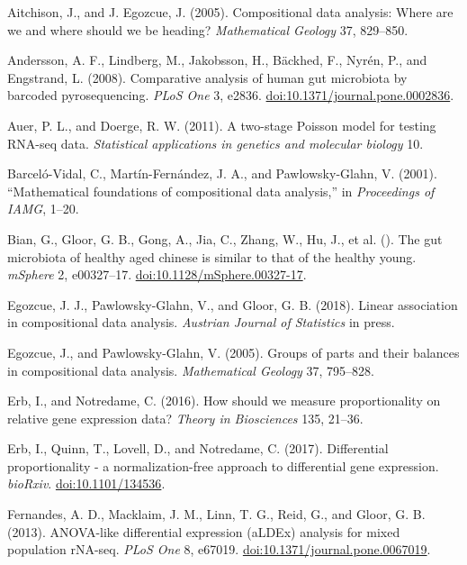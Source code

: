 \documentclass[twocolumn]{article}
\begin{document}
Aitchison, J., and J. Egozcue, J. (2005). Compositional data analysis:
Where are we and where should we be heading? \emph{Mathematical Geology}
37, 829--850.

Andersson, A. F., Lindberg, M., Jakobsson, H., Bäckhed, F., Nyrén, P.,
and Engstrand, L. (2008). Comparative analysis of human gut microbiota
by barcoded pyrosequencing. \emph{PLoS One} 3, e2836.
\href{http://doi.org/10.1371/journal.pone.0002836}{doi:10.1371/journal.pone.0002836}.

Auer, P. L., and Doerge, R. W. (2011). A two-stage Poisson model for
testing RNA-seq data. \emph{Statistical applications in genetics and
molecular biology} 10.

Barceló-Vidal, C., Martín-Fernández, J. A., and Pawlowsky-Glahn, V.
(2001). ``Mathematical foundations of compositional data analysis,'' in
\emph{Proceedings of IAMG}, 1--20.

Bian, G., Gloor, G. B., Gong, A., Jia, C., Zhang, W., Hu, J., et al. ().
The gut microbiota of healthy aged chinese is similar to that of the
healthy young. \emph{mSphere} 2, e00327--17.
\href{http://doi.org/10.1128/mSphere.00327-17}{doi:10.1128/mSphere.00327-17}.

Egozcue, J. J., Pawlowsky-Glahn, V., and Gloor, G. B. (2018). Linear
association in compositional data analysis. \emph{Austrian Journal of
Statistics} in press.

Egozcue, J., and Pawlowsky-Glahn, V. (2005). Groups of parts and their
balances in compositional data analysis. \emph{Mathematical Geology} 37,
795--828.

Erb, I., and Notredame, C. (2016). How should we measure proportionality
on relative gene expression data? \emph{Theory in Biosciences} 135,
21--36.

Erb, I., Quinn, T., Lovell, D., and Notredame, C. (2017). Differential
proportionality - a normalization-free approach to differential gene
expression. \emph{bioRxiv}.
\href{http://doi.org/10.1101/134536}{doi:10.1101/134536}.

Fernandes, A. D., Macklaim, J. M., Linn, T. G., Reid, G., and Gloor, G.
B. (2013). ANOVA-like differential expression (aLDEx) analysis for mixed
population rNA-seq. \emph{PLoS One} 8, e67019.
\href{http://doi.org/10.1371/journal.pone.0067019}{doi:10.1371/journal.pone.0067019}.
\end{document}
